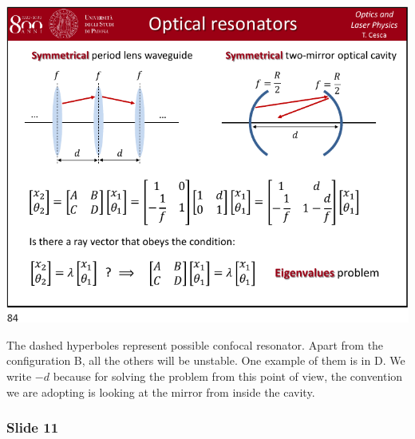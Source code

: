 \documentclass[../main/main.tex]{subfiles}
\begin{document}
\begin{minipage}[]{0.5\linewidth}
\centering
\includegraphics[page=10,width=1\textwidth]{../lessons/pdf_file/21_lecture.pdf}
\end{minipage}
\hspace{0.3cm}\vspace{0.3cm}
\begin{minipage}[c]{0.47\linewidth}

The dashed hyperboles represent possible confocal resonator. Apart from the configuration B, all the others will be unstable. One example of them is in D. We write \( -d \) because for solving the problem from this point of view, the convention we are adopting is looking at the mirror from inside the cavity.

\end{minipage}

\subsubsection*{Slide 11}
\end{document}
